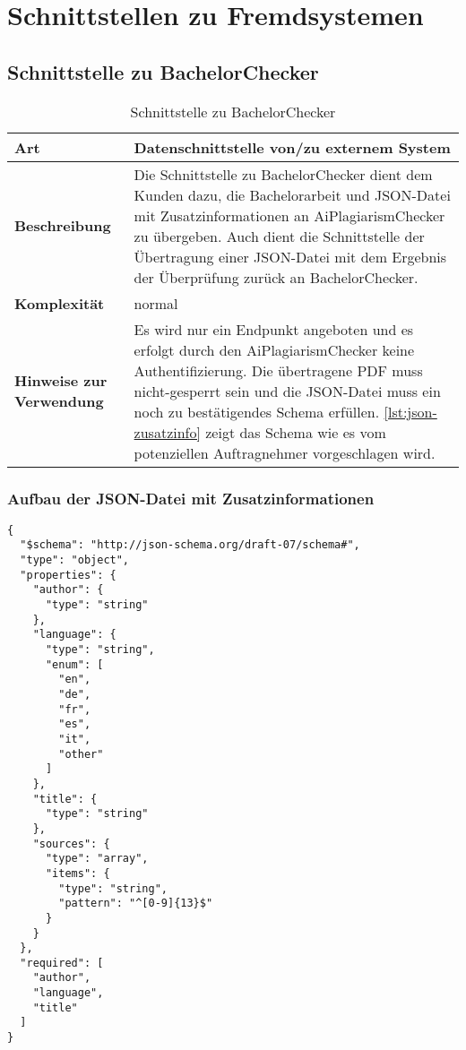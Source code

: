 \chapter{Schnittstellen zu Fremdsystemen}\label{ch:schnittstellen}


\section{Schnittstelle zu BachelorChecker}\label{sec:schnittstelle-bachelorchecker}

\begin{table}[H]
    \label{tab:schnittstelle-bachelorchecker}
    \begin{tabularx}{\textwidth}{|l|X|}
        \hline
        \textbf{Art}         & Datenschnittstelle von/zu externem System \\
        \hline
        \textbf{Beschreibung} & Die Schnittstelle zu BachelorChecker dient dem Kunden dazu, die Bachelorarbeit und JSON-Datei mit Zusatzinformationen an AiPlagiarismChecker zu übergeben.
        Auch dient die Schnittstelle der Übertragung einer JSON-Datei mit dem Ergebnis der Überprüfung zurück an BachelorChecker. \\
        \hline
        \textbf{Komplexität} & normal                                    \\
        \hline
        \textbf{Hinweise zur Verwendung} & Es wird nur ein Endpunkt angeboten und es erfolgt durch den AiPlagiarismChecker keine Authentifizierung.
        Die übertragene PDF muss nicht-gesperrt sein und die JSON-Datei muss ein noch zu bestätigendes Schema erfüllen.
        \autoref{lst:json-zusatzinfo} zeigt das Schema wie es vom potenziellen Auftragnehmer vorgeschlagen wird. \\
        \hline
    \end{tabularx}
    \caption {Schnittstelle zu BachelorChecker}
\end{table}

\subsection{Aufbau der JSON-Datei mit Zusatzinformationen}\label{subsec:json-zusatzinfo}
\begin{lstlisting}[caption={JSON-Datei mit Zusatzinformationen},captionpos=b,label={lst:json-zusatzinfo}]
{
  "$schema": "http://json-schema.org/draft-07/schema#",
  "type": "object",
  "properties": {
    "author": {
      "type": "string"
    },
    "language": {
      "type": "string",
      "enum": [
        "en",
        "de",
        "fr",
        "es",
        "it",
        "other"
      ]
    },
    "title": {
      "type": "string"
    },
    "sources": {
      "type": "array",
      "items": {
        "type": "string",
        "pattern": "^[0-9]{13}$"
      }
    }
  },
  "required": [
    "author",
    "language",
    "title"
  ]
}
\end{lstlisting}

